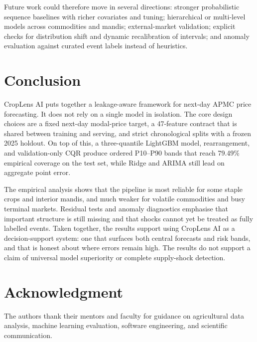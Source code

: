 \documentclass[a4paper,conference]{IEEEtran}
\begin{document}
Future work could therefore move in several directions: stronger probabilistic sequence baselines with richer covariates and tuning; hierarchical or multi-level models across commodities and mandis; external-market validation; explicit checks for distribution shift and dynamic recalibration of intervals; and anomaly evaluation against curated event labels instead of heuristics.

\section{Conclusion}
CropLens AI puts together a leakage-aware framework for next-day APMC price forecasting. It does not rely on a single model in isolation. The core design choices are a fixed next-day modal-price target, a 47-feature contract that is shared between training and serving, and strict chronological splits with a frozen 2025 holdout. On top of this, a three-quantile LightGBM model, rearrangement, and validation-only CQR produce ordered P10--P90 bands that reach 79.49\% empirical coverage on the test set, while Ridge and ARIMA still lead on aggregate point error.

The empirical analysis shows that the pipeline is most reliable for some staple crops and interior mandis, and much weaker for volatile commodities and busy terminal markets. Residual tests and anomaly diagnostics emphasise that important structure is still missing and that shocks cannot yet be treated as fully labelled events. Taken together, the results support using CropLens AI as a decision-support system: one that surfaces both central forecasts and risk bands, and that is honest about where errors remain high. The results do not support a claim of universal model superiority or complete supply-shock detection.

\section*{Acknowledgment}
The authors thank their mentors and faculty for guidance on agricultural data analysis, machine learning evaluation, software engineering, and scientific communication.



\end{document}
